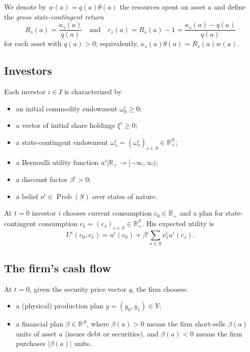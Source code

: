 \documentclass[11pt,a4paper,oneside]{book}
\def\R{\mathbb{R}}
\def\geq{\geqslant}
\def\et{\quad \text{and} \quad}
\DeclareMathOperator{\Prob}{Prob}
\theoremstyle{plain}
\theoremstyle{definition}
\theoremstyle{remark}
\numberwithin{equation}{chapter}
\begin{document}
We denote by $w(a) = q(a) \theta(a)$ the resources spent on asset $a$ and define the \emph{gross state-contingent return}
\begin{equation*}
  R_s(a) = \frac{\kappa_s(a)}{q(a)}
  \et
  r_s(a) = R_s(a) - 1 = \frac{\kappa_s(a) - q(a)}{q(a)}
\end{equation*}
for each asset with $q(a) > 0$; equivalently, $\kappa_s(a) \theta(a) = R_s(a) w(a)$.

\subsection{Investors}

Each investor $i \in I$ is characterized by
\begin{itemize}
  \item an initial commodity endowment $\omega^i_0 \geq 0$;
  \item a vector of initial share holdings $\xi^i \geq 0$;
  \item a state-contingent endowment $\omega^i_1 = (\omega^i_s)_{s \in S} \in \R^{S}_{+}$;
  \item a Bernoulli utility function $u^i \vert \R_+ \to [-\infty, \infty)$;
  \item a discount factor $\beta^i > 0$;
  \item a belief $\nu^i \in \Prob(S)$ over states of nature.
\end{itemize}
At $t=0$ investor $i$ chooses current consumption $c_0 \in \R_+$ and a plan for state-contingent consumption $c_1 = (c_s)_{s \in S} \in \R_+^S$.
His expected utility is
\begin{equation}\label{eq:expected-utility}
  U^i(c_0, c_1) = u^i(c_0) + \beta^i \sum_{s \in S} \nu^i_s u^i(c_s).
\end{equation}

\subsection{The firm's cash flow}

At $t=0$, given the security price vector $q$, the firm chooses:
\begin{itemize}
  \item a (physical) production plan $y = (y_0, y_1) \in Y$;
  \item a financial plan $\beta \in \R^A$, where $\beta(a) > 0$ means the firm short-sells $\beta(a)$ units of asset $a$ (issues debt or securities), and $\beta(a) < 0$ means the firm purchases $|\beta(a)|$ units.
\end{itemize}
\end{document}
